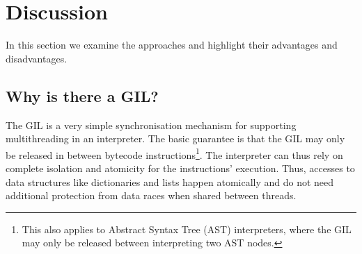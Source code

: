 \documentclass{sigplanconf}
\begin{document}






\section{Discussion}

In this section we examine the approaches and highlight their
advantages and disadvantages.


\subsection{Why is there a GIL?}
The GIL is a very simple synchronisation mechanism for supporting
multithreading in an interpreter. The basic guarantee is that the GIL
may only be released in between bytecode instructions\footnote{This
also applies to Abstract Syntax Tree (AST) interpreters, where the GIL
may only be released between interpreting two AST nodes.}. The interpreter
can thus rely on complete isolation and atomicity for the
instructions' execution. Thus, accesses to data structures like
dictionaries and lists happen atomically and do not need additional
protection from data races when shared between threads.
\end{document}
